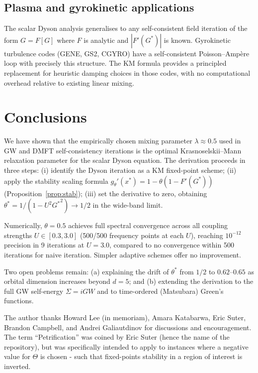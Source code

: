 \documentclass[aps,prb,twocolumn,superscriptaddress,nofootinbib,longbibliography,floatfix]{revtex4-2}
\newcommand{\optparam}{\theta^{*}}
\newcommand{\KM}{Krasnoselskii--Mann}
\newcommand{\Gstar}{G^{*}}
\theoremstyle{plain}
\theoremstyle{remark}
\begin{document}
\subsection{Plasma and gyrokinetic applications}

The scalar Dyson analysis generalises to any self-consistent
field iteration of the form $G = F[G]$ where $F$ is analytic
and $|F'(\Gstar)|$ is known.  Gyrokinetic turbulence codes
(GENE, GS2, CGYRO) have a self-consistent Poisson--Amp\`ere
loop with precisely this structure.  The KM formula provides a
principled replacement for heuristic damping choices in those
codes, with no computational overhead relative to existing
linear mixing.

\section{Conclusions}
\label{sec:conclusions}

We have shown that the empirically chosen mixing parameter
$\lambda \approx 0.5$ used in GW and DMFT self-consistency
iterations is the optimal \KM{} relaxation parameter for the
scalar Dyson equation.  The derivation proceeds in three steps:
(i) identify the Dyson iteration as a KM fixed-point scheme;
(ii) apply the stability scaling formula
$g_\theta'(x^*) = 1 - \theta(1 - F'(\Gstar))$
(Proposition~\ref{prop:stab}); (iii) set the derivative to
zero, obtaining $\optparam = 1/(1 - U^2{\Gstar}^2) \to 1/2$
in the wide-band limit.

Numerically, $\theta = 0.5$ achieves full spectral convergence
across all coupling strengths $U \in [0.3, 3.0]$ (500/500
frequency points at each $U$), reaching $10^{-12}$ precision
in 9 iterations at $U = 3.0$, compared to no convergence within
500 iterations for naive iteration.  Simpler adaptive schemes offer no improvement.

Two open problems remain: (a) explaining the drift of $\theta^*$
from $1/2$ to $0.62$--$0.65$ as orbital dimension increases
beyond $d = 5$; and (b) extending the derivation to the full
GW self-energy $\Sigma = iGW$ and to time-ordered (Matsubara)
Green's functions.

\begin{acknowledgments}
The author thanks Howard Lee (in memoriam), Amara Katabarwa,
Eric Suter, Brandon Campbell, and Andrei Galiautdinov for
discussions and encouragement.  The term ``Petrification'' was
coined by Eric Suter (hence the name of the repository), but was
specifically intended to apply to instances where a negative value
for $\Theta$ is chosen - such that fixed-points stability in a
region of interest is inverted.
\end{acknowledgments}
\end{document}
